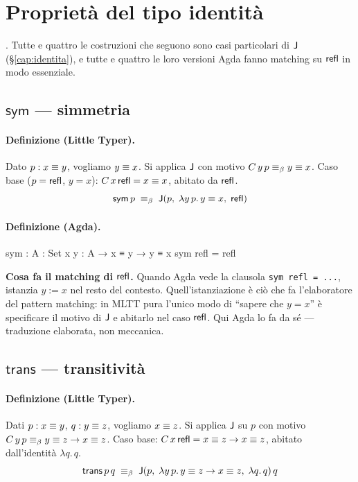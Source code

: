 \section{Propriet\`a del tipo identit\`a}\label{sec:notevoli-id}

. Tutte e quattro le costruzioni che seguono sono casi particolari di $\mathsf{J}$ (\S\ref{cap:identita}), e tutte e quattro le loro versioni Agda fanno matching su $\mathsf{refl}$ in modo essenziale.

\subsection*{$\mathsf{sym}$ --- simmetria}

\paragraph{Definizione (Little Typer).} Dato $p : x \equiv y$, vogliamo $y \equiv x$. Si applica $\mathsf{J}$ con motivo $C\,y\,p \equiv_{\beta} y \equiv x$. Caso base ($p = \mathsf{refl}$, $y = x$): $C\,x\,\mathsf{refl} = x \equiv x$, abitato da $\mathsf{refl}$.
\[
\mathsf{sym}\,p \;\equiv_{\beta}\; \mathsf{J}(p,\;\lambda y\,p.\,y \equiv x,\;\mathsf{refl})
\]

\paragraph{Definizione (Agda).}
\begin{agda}
sym : {A : Set} {x y : A} → x ≡ y → y ≡ x
sym refl = refl
\end{agda}

\noindent\textbf{Cosa fa il matching di $\mathsf{refl}$.} Quando Agda vede la clausola \texttt{sym refl = ...}, istanzia $y := x$ nel resto del contesto. Quell'istanziazione \`e ci\`o che fa l'elaboratore del pattern matching: in MLTT pura l'unico modo di ``sapere che $y = x$'' \`e specificare il motivo di $\mathsf{J}$ e abitarlo nel caso $\mathsf{refl}$. Qui Agda lo fa da s\'e --- traduzione elaborata, non meccanica.

\subsection*{$\mathsf{trans}$ --- transitivit\`a}

\paragraph{Definizione (Little Typer).} Dati $p : x \equiv y$, $q : y \equiv z$, vogliamo $x \equiv z$. Si applica $\mathsf{J}$ su $p$ con motivo $C\,y\,p \equiv_{\beta} y \equiv z \to x \equiv z$. Caso base: $C\,x\,\mathsf{refl} = x \equiv z \to x \equiv z$, abitato dall'identit\`a $\lambda q.\,q$.
\[
\mathsf{trans}\,p\,q \;\equiv_{\beta}\; \mathsf{J}(p,\;\lambda y\,p.\,y \equiv z \to x \equiv z,\;\lambda q.\,q)\,q
\]

